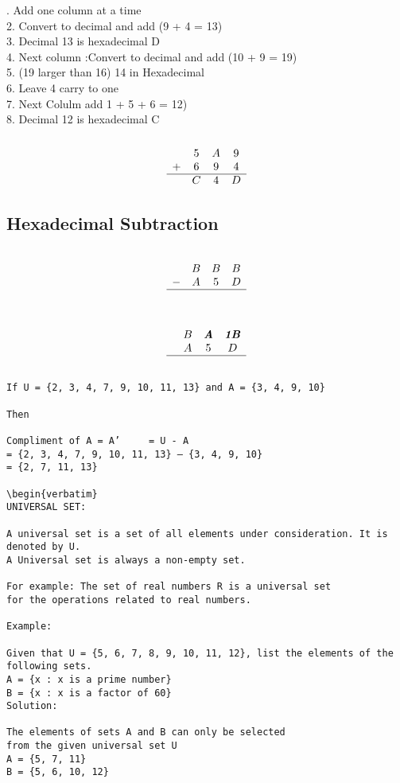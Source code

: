 \documentclass[a4paper,12pt]{article}
\begin{document}
. Add one column at a time\\
2. Convert to decimal and add (9 + 4 = 13)\\
3. Decimal 13 is hexadecimal D\\
4. Next column :Convert to decimal and add (10 + 9 = 19)\\
5. (19 larger than 16) 14 in Hexadecimal \\
6. Leave 4 carry to one\\
7.  Next Colulm add 1 + 5 + 6 = 12)\\
8. Decimal 12 is hexadecimal C\\

\[\begin{array}{cccc}
	&		&		&		\\	
	&	5	&	A	&	9	\\	
	+&	6	&	9	&	4	\\	\hline
	&	C	&	4	&	D	\\	
\end{array} \]

\subsection*{Hexadecimal Subtraction}
\[\begin{array}{cccc}
	&		&		&		\\	
	&	B	&	B	&	B	\\	
	-&	A	&	5	&	D	\\	\hline
	&		&		&		\\	
\end{array} \]


\[\begin{array}{cccc}
	&		&		&		\\	
	&	B	&	\textbf{\emph{A}}	&	\textbf{\emph{1B}}	\\	
	&	A	&	5	&	D	\\	\hline
	&		&		&		\\	
\end{array} \]


\newpage
\begin{verbatim}
If U = {2, 3, 4, 7, 9, 10, 11, 13} and A = {3, 4, 9, 10}

Then

Compliment of A = A’	 = U - A
= {2, 3, 4, 7, 9, 10, 11, 13} – {3, 4, 9, 10}
= {2, 7, 11, 13}

\begin{verbatim}
UNIVERSAL SET: 

A universal set is a set of all elements under consideration. It is denoted by U. 
A Universal set is always a non-empty set.

For example: The set of real numbers R is a universal set
for the operations related to real numbers.

Example: 

Given that U = {5, 6, 7, 8, 9, 10, 11, 12}, list the elements of the following sets. 
A = {x : x is a prime number}
B = {x : x is a factor of 60}
Solution: 

The elements of sets A and B can only be selected 
from the given universal set U 
A = {5, 7, 11}
B = {5, 6, 10, 12}
\end{verbatim}
\end{document}

